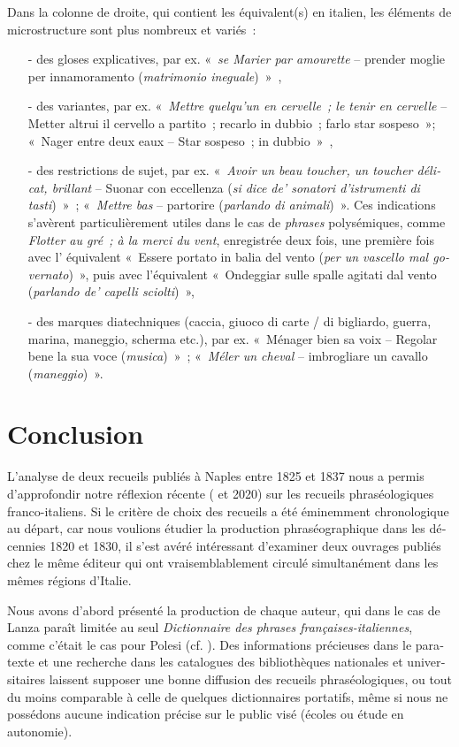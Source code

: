 \documentclass[output=paper,booklanguage=french]{langscibook}
\begin{document}
\begin{otherlanguage}{french}
Dans la colonne de droite, qui contient les équivalent(s) en italien, les éléments de microstructure sont plus nombreux et variés~:

\begin{itemize}
    \item [-] des gloses explicatives, par ex. «~\emph{se Marier par amourette} – prender moglie per innamoramento (\emph{matrimonio ineguale})~»~,
    \item [-] des variantes, par ex. «~\emph{Mettre quelqu’un en cervelle~; le tenir en cervelle} – Metter altrui il cervello a partito~; recarlo in dubbio~; farlo star sospeso~»; «~Nager entre deux eaux – Star sospeso~; in dubbio~»~,
    \item [-] des restrictions de sujet, par ex. «~\emph{Avoir un beau toucher, un toucher délicat, brillant} – Suonar con eccellenza (\emph{si dice de’ sonatori d’istrumenti di tasti})~»~; «~\emph{Mettre bas} – partorire (\emph{parlando di animali})~». Ces indications s’avèrent particulièrement utiles dans le cas de \emph{phrases} polysémiques, comme \emph{Flotter au gré~; à la merci du vent}, enregistrée deux fois, une première fois avec l’ équivalent «~Essere portato in balia del vento (\emph{per un vascello mal governato})~», puis avec l’équivalent «~Ondeggiar sulle spalle agitati dal vento (\emph{parlando de’ capelli sciolti})~»,
    \item [-] des marques diatechniques (caccia, giuoco di carte / di bigliardo, guerra, marina, maneggio, scherma etc.), par ex. «~Ménager bien sa voix – Regolar bene la sua voce (\emph{musica})~»~; «~\emph{Méler un cheval} – imbrogliare un cavallo (\emph{maneggio})~».
\end{itemize}

\section{Conclusion}

L’analyse de deux recueils publiés à Naples entre 1825 et 1837 nous a permis d’approfondir notre réflexion récente (\citealt{Murano2017}  et 2020) sur les recueils phraséologiques franco-italiens. Si le critère de choix des recueils a été éminemment chronologique au départ, car nous voulions étudier la production phraséographique dans les décennies 1820 et 1830, il s’est avéré intéressant d’examiner deux ouvrages publiés chez le même éditeur qui ont vraisemblablement circulé simultanément dans les mêmes régions d’Italie.

Nous avons d’abord présenté la production de chaque auteur, qui dans le cas de Lanza paraît limitée au seul \emph{Dictionnaire des phrases françaises-italiennes}, comme c’était le cas pour Polesi (cf. \citealt{Murano2020}). Des informations précieuses dans le paratexte et une recherche dans les catalogues des bibliothèques nationales et universitaires laissent supposer une bonne diffusion des recueils phraséologiques, ou tout du moins comparable à celle de quelques dictionnaires portatifs, même si nous ne possédons aucune indication précise sur le public visé (écoles ou étude en autonomie).


\end{otherlanguage}
\end{document}
